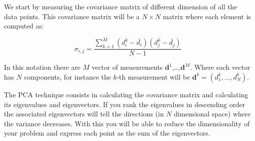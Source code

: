 \documentclass{article}
\begin{document}
We start by measuring the covariance matrix of different dimension of all the data points. This covariance matrix will be a $N\times N$ matrix where each element is computed as:

\begin{equation}
\sigma_{i,j} = \frac{\sum_{k=1}^{M} (d^{k}_i - \bar{d_i})(d^{k}_j -\bar{d_{j}})}{N-1}
\end{equation}

In this notation there are $M$ vector of measurements ${\mathbf d}^{1}$,\ldots,${\mathbf d}^{M}$. Where each vector has $N$ components, for instance the $k$-th measurement will be ${\mathbf d}^{k}=(d^k_{1},\ldots,d^k_{N})$.

The PCA technique consists in calculating the covariance matrix and calculating its eigenvalues and eigenvectors. If you rank the eigenvalues in descending order the associated eigenvectors will tell the directions (in $N$ dimensional space) where the variance decreases. With this you will be able to reduce the dimensionality of your problem and express each point as the sum of the eigenvectors.
\end{document}

